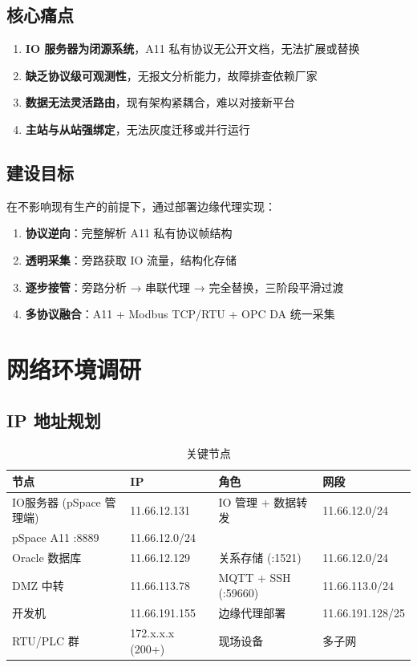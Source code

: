 \documentclass[12pt,a4paper]{ctexart}
\begin{document}
\subsection{核心痛点}

\begin{enumerate}[leftmargin=*]
  \item \textbf{IO 服务器为闭源系统}，A11 私有协议无公开文档，无法扩展或替换
  \item \textbf{缺乏协议级可观测性}，无报文分析能力，故障排查依赖厂家
  \item \textbf{数据无法灵活路由}，现有架构紧耦合，难以对接新平台
  \item \textbf{主站与从站强绑定}，无法灰度迁移或并行运行
\end{enumerate}

\subsection{建设目标}

在不影响现有生产的前提下，通过部署边缘代理实现：

\begin{enumerate}[leftmargin=*]
  \item \textbf{协议逆向}：完整解析 A11 私有协议帧结构
  \item \textbf{透明采集}：旁路获取 IO 流量，结构化存储
  \item \textbf{逐步接管}：旁路分析 → 串联代理 → 完全替换，三阶段平滑过渡
  \item \textbf{多协议融合}：A11 + Modbus TCP/RTU + OPC DA 统一采集
\end{enumerate}

\section{网络环境调研}

\subsection{IP 地址规划}

\begin{table}[H]\centering
\caption{关键节点}
\begin{tabular}{p{3.5cm} p{4cm} p{4cm} p{3cm}}
\toprule
\textbf{节点} & \textbf{IP} & \textbf{角色} & \textbf{网段} \\
\midrule
IO服务器 (pSpace 管理端) & 11.66.12.131 & IO 管理 + 数据转发 & 11.66.12.0/24 \\
pSpace A11 :8889 & 11.66.12.0/24 \\
Oracle 数据库 & 11.66.12.129 & 关系存储 (:1521) & 11.66.12.0/24 \\
DMZ 中转 & 11.66.113.78 & MQTT + SSH (:59660) & 11.66.113.0/24 \\
开发机 & 11.66.191.155 & 边缘代理部署 & 11.66.191.128/25 \\
RTU/PLC 群 & 172.x.x.x (200+) & 现场设备 & 多子网 \\
\bottomrule
\end{tabular}
\end{table}
\end{document}
